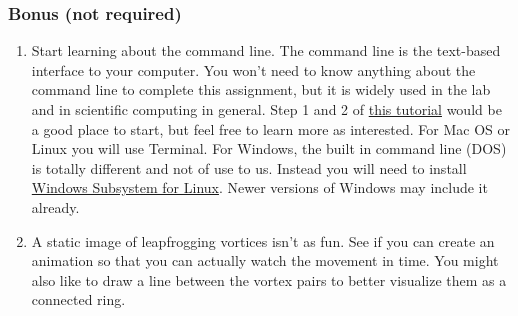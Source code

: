 \documentclass{article}
\begin{document}
\subsubsection*{Bonus (not required)}
\begin{enumerate}
    \item Start learning about the command line.  The command line is the text-based interface to your computer.  You won't need to know anything about the command line to complete this assignment, but it is widely used in the lab and in scientific computing in general.  Step 1 and 2 of \href{https://www.codecademy.com/learn/learn-the-command-line}{this tutorial} would be a good place to start, but feel free to learn more as interested.  For Mac OS or Linux you will use Terminal.  For Windows, the built in command line (DOS) is totally different and not of use to us. Instead you will need to install \href{https://docs.microsoft.com/en-us/windows/wsl/about}{Windows Subsystem for Linux}.  Newer versions of Windows may include it already.
    \item A static image of leapfrogging vortices isn't as fun.  See if you can create an animation so that you can actually watch the movement in time.  You might also like to draw a line between the vortex pairs to better visualize them as a connected ring.
\end{enumerate}
\end{document}
